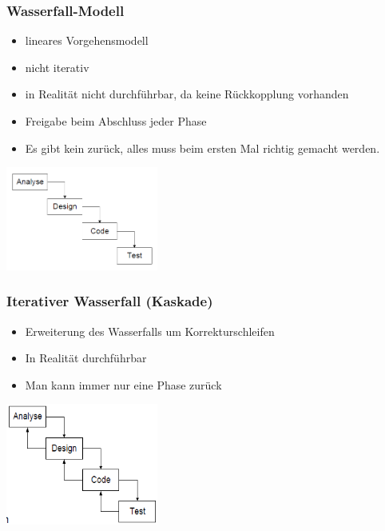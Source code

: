 \subsubsection{Wasserfall-Modell}
\begin{minipage}{10cm}
	\begin{itemize}
		\item lineares Vorgehensmodell
		\item nicht iterativ
		\item in Realität nicht durchführbar, da keine Rückkopplung vorhanden
		\item Freigabe beim Abschluss jeder Phase
		\item Es gibt kein zurück, alles muss beim ersten Mal richtig gemacht werden. 
	\end{itemize}
\end{minipage}
\begin{minipage}{5cm}
	\includegraphics[width=5cm]{images/wasserfallmodell}
\end{minipage}
	
\subsubsection{Iterativer Wasserfall (Kaskade)}
	\begin{minipage}{10cm}
		\begin{itemize}
			\item Erweiterung des Wasserfalls um Korrekturschleifen
			\item In Realität durchführbar
			\item Man kann immer nur eine Phase zurück
		\end{itemize}
	\end{minipage}
	\begin{minipage}{5cm}
	\includegraphics[width=5cm]{images/kaskade.png}	
	\end{minipage}

